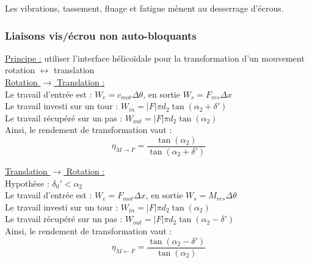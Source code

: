 \documentclass[../main.tex]{subfiles}
\begin{document}
Les vibrations, tassement, fluage et fatigue mènent au desserrage d'écrous.\\

\subsubsection{Liaisons vis/écrou non auto-bloquants}
\underline{Principe :} utiliser l'interface hélicoïdale pour la transformation d'un mouvement rotation $\leftrightarrow$ translation\\

\quad \underline{Rotation $\rightarrow$ Translation :}\\
Le travail d'entrée est : $W_e = c_{mot} \Delta \theta$, en sortie $W_s = F_{res} \Delta x$\\
Le travail investi sur un tour : $W_{in} = \lvert F \rvert \pi d_2 \tan(\alpha_2+\delta')$\\
Le travail récupéré sur un pas : $W_{out} = \lvert F \rvert \pi d_2 \tan(\alpha_2)$\\

Ainsi, le rendement de transformation vaut :\\
\begin{equation}
    \eta_{M\rightarrow F} = \frac{\tan(\alpha_2)}{\tan(\alpha_2+\delta')}
\end{equation}

\quad \underline{Translation $\rightarrow$ Rotation :}\\
Hypothèse : $\delta_0' < \alpha_2$\\

Le travail d'entrée est : $W_e = F_{mot} \Delta x$, en sortie $W_s = M_{res} \Delta \theta$\\
Le travail investi sur un tour : $W_{in} = \lvert F \rvert \pi d_2 \tan(\alpha_2)$\\
Le travail récupéré sur un pas : $W_{out} = \lvert F \rvert \pi d_2 \tan(\alpha_2-\delta')$\\

Ainsi, le rendement de transformation vaut :\\
\begin{equation}
    \eta_{M\leftarrow F} = \frac{\tan(\alpha_2-\delta')}{\tan(\alpha_2)}
\end{equation}
\end{document}
